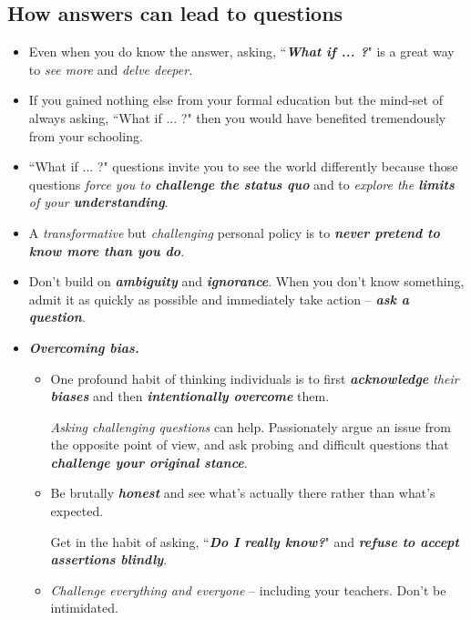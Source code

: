 \documentclass[11pt]{article}
\begin{document}
\subsection{How answers can lead to questions}
\begin{itemize}
\item Even when you do know the answer, asking, ``\emph{\textbf{What if ... ?}}" is a great way to \emph{see more} and \emph{delve deeper}. 

\item If you gained nothing else from your formal education but the mind-set of always asking, ``What if ... ?" then you would have benefited tremendously from your schooling. 

\item ``What if ... ?" questions invite you to see the world differently because those questions \emph{force you to \textbf{challenge the status quo}} and to \emph{explore the \textbf{limits} of your \textbf{understanding}}. 

\item A \emph{transformative} but \emph{challenging} personal policy is to \emph{\textbf{never pretend to know more than you do}}.

\item Don’t build on \emph{\textbf{ambiguity}} and \emph{\textbf{ignorance}}. When you don’t know something, admit it as quickly as possible and immediately take action -- \emph{\textbf{ask a question}}.

\item \emph{\textbf{Overcoming bias.}} 
\begin{itemize}
\item One profound habit of thinking individuals is to first \emph{\textbf{acknowledge} their \textbf{biases}} and then \emph{\textbf{intentionally overcome}} them. 

\emph{Asking challenging questions} can help. Passionately argue an issue from the opposite point of view, and ask probing and difficult questions that \emph{\textbf{challenge your original stance}}. 

\item Be brutally \emph{\textbf{honest}} and see what’s actually there rather than what’s expected. 

Get in the habit of asking, ``\emph{\textbf{Do I really know?}}" and \emph{\textbf{refuse to accept assertions blindly}}.

\item \emph{Challenge everything and everyone} -- including your teachers. Don’t be intimidated. 


\end{itemize}
\end{itemize}
\end{document}
